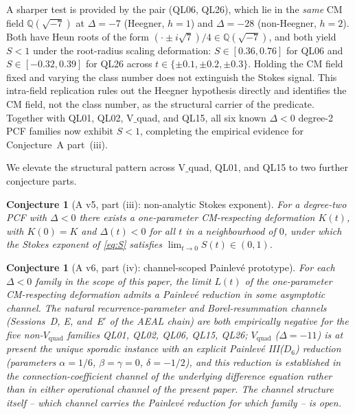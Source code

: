 \documentclass[12pt]{amsart}
\newtheorem{conjecture}[theorem]{Conjecture}
\theoremstyle{definition}
\begin{document}
A sharper test is provided by the pair (QL06, QL26), which lie
in the \emph{same} CM field $\mathbb{Q}(\sqrt{-7})$ at
$\Delta=-7$ (Heegner, $h=1$) and $\Delta=-28$
(non-Heegner, $h=2$). Both have Heun roots of the form
$(\cdot \pm i\sqrt{7})/4 \in \mathbb{Q}(\sqrt{-7})$, and both
yield $S<1$ under the root-radius scaling deformation:
$S\in[0.36,0.76]$ for QL06 and $S\in[-0.32,0.39]$ for QL26
across $t\in\{\pm 0.1,\pm 0.2,\pm 0.3\}$. Holding the CM field
fixed and varying the class number does not extinguish the Stokes
signal. This intra-field replication rules out the Heegner
hypothesis directly and identifies the CM field, not the class
number, as the structural carrier of the predicate. Together with
QL01, QL02, V$\_$quad, and QL15, all six known $\Delta<0$ degree-2
PCF families now exhibit $S<1$, completing the empirical evidence
for Conjecture~A part~(iii).

We elevate the structural pattern across V$\_$quad, QL01, and QL15
to two further conjecture parts.

\begin{conjecture}[A v5, part (iii): non-analytic Stokes
exponent]\label{conj:A3}
For a degree-two PCF with $\Delta<0$ there exists a one-parameter
CM-respecting deformation $K(t)$, with $K(0)=K$ and $\Delta(t)<0$ for all
$t$ in a neighbourhood of $0$, under which the Stokes exponent of
\eqref{eq:S} satisfies $\lim_{t\to 0}S(t)\in(0,1)$.
\end{conjecture}

\begin{conjecture}[A v6, part (iv): channel-scoped Painlev\'e
prototype]\label{conj:A4}
For each $\Delta<0$ family in the scope of this paper, the limit
$L(t)$ of the one-parameter CM-respecting deformation admits a
Painlev\'e reduction in some asymptotic channel. The natural
recurrence-parameter and Borel-resummation channels (Sessions~D, E,
and~E$'$ of the AEAL chain) are both empirically negative for the
five non-$V_{\mathrm{quad}}$ families QL01, QL02, QL06, QL15, QL26;
$V_{\mathrm{quad}}$ ($\Delta=-11$) is at present the unique sporadic
instance with an explicit Painlev\'e III($D_{6}$) reduction
(parameters $\alpha=1/6$, $\beta=\gamma=0$, $\delta=-1/2$), and
this reduction is established in the connection-coefficient channel
of the underlying difference equation rather than in either
operational channel of the present paper. The channel structure
itself -- which channel carries the Painlev\'e reduction for which
family -- is open.
\end{conjecture}
\end{document}

